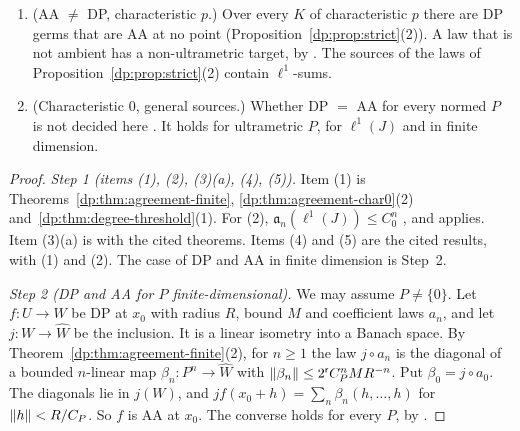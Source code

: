 \begin{theorem}
\begin{enumerate}
\begin{enumerate}
\end{enumerate}
\item \textup{(AA $\ne$ DP, characteristic $p$.)} Over every $K$ of characteristic $p$ there are DP germs that are AA at no point (Proposition~\ref{dp:prop:strict}(2)). A law that is not ambient has a non-ultrametric target, by \cite[Theorem~14.39(4)]{I}. The sources of the laws of Proposition~\ref{dp:prop:strict}(2) contain $\ell^1$-sums.
\item \textup{(Characteristic $0$, general sources.)} Whether DP $=$ AA for every normed $P$ is not decided here \cite[Question~14.42(1)]{I}. It holds for ultrametric $P$, for $\ell^1(J)$ and in finite dimension.
\end{enumerate}
\end{theorem}

\begin{proof}
\emph{Step 1 (items (1), (2), (3)(a), (4), (5)).} Item (1) is Theorems~\ref{dp:thm:agreement-finite}, \ref{dp:thm:agreement-char0}(2) and~\ref{dp:thm:degree-threshold}(1). For (2), $\mathfrak a_n(\ell^1(J))\le C_0^n$ \cite[Theorem~14.39(2)]{I}, and \cite[Theorem~14.38(1)]{I} applies. Item (3)(a) is \cite[Theorem~14.39(1)]{I} with the cited theorems. Items (4) and (5) are the cited results, with (1) and (2). The case of DP and AA in finite dimension is Step~2.

\emph{Step 2 (DP and AA for $P$ finite-dimensional).} We may assume $P\ne\{0\}$. Let $f\colon U\to W$ be DP at $x_0$ with radius $R$, bound $M$ and coefficient laws $a_n$, and let $j\colon W\to\widehat W$ be the inclusion. It is a linear isometry into a Banach space. By Theorem~\ref{dp:thm:agreement-finite}(2), for $n\ge1$ the law $j\circ a_n$ is the diagonal of a bounded $n$\nobreakdash-linear map $\beta_n\colon P^n\to\widehat W$ with $\lVert \beta_n\rVert\le2^{\mathsf r}C_P^nMR^{-n}$. Put $\beta_0=j\circ a_0$. The diagonals lie in $j(W)$, and $jf(x_0+h)=\sum_n\beta_n(h,\dots,h)$ for $\lVert h\rVert<R/C_P$. So $f$ is AA at $x_0$. The converse holds for every $P$, by \cite[Proposition~14.9(1)]{I}.


\end{proof}
